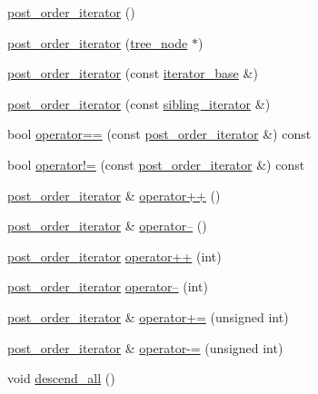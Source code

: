 \begin{CompactItemize}
\item 
\hyperlink{classtree_1_1post__order__iterator_f6d2a1ff77da1ca318447faef819fb22}{post\_\-order\_\-iterator} ()
\item 
\hyperlink{classtree_1_1post__order__iterator_add3e555f6a69c1799cb5b9b12e3ef48}{post\_\-order\_\-iterator} (\hyperlink{classtree__node__}{tree\_\-node} $\ast$)
\item 
\hyperlink{classtree_1_1post__order__iterator_bbe898c229fab7e833da744a76aca5ab}{post\_\-order\_\-iterator} (const \hyperlink{classtree_1_1iterator__base}{iterator\_\-base} \&)
\item 
\hyperlink{classtree_1_1post__order__iterator_d1bba922181132f5c41a6ebd5230abe9}{post\_\-order\_\-iterator} (const \hyperlink{classtree_1_1sibling__iterator}{sibling\_\-iterator} \&)
\item 
bool \hyperlink{classtree_1_1post__order__iterator_b1303f191d6bc8a62e5f03fa53466ec4}{operator==} (const \hyperlink{classtree_1_1post__order__iterator}{post\_\-order\_\-iterator} \&) const 
\item 
bool \hyperlink{classtree_1_1post__order__iterator_59f0d0d145f27ed094a69214e1831102}{operator!=} (const \hyperlink{classtree_1_1post__order__iterator}{post\_\-order\_\-iterator} \&) const 
\item 
\hyperlink{classtree_1_1post__order__iterator}{post\_\-order\_\-iterator} \& \hyperlink{classtree_1_1post__order__iterator_baba42c4ecb0a0bb8b21b0c28dfa3009}{operator++} ()
\item 
\hyperlink{classtree_1_1post__order__iterator}{post\_\-order\_\-iterator} \& \hyperlink{classtree_1_1post__order__iterator_f70bbd10b24ca0cf1c674e4ef40899db}{operator--} ()
\item 
\hyperlink{classtree_1_1post__order__iterator}{post\_\-order\_\-iterator} \hyperlink{classtree_1_1post__order__iterator_7041325e846017886e7c43d9c1c2cddb}{operator++} (int)
\item 
\hyperlink{classtree_1_1post__order__iterator}{post\_\-order\_\-iterator} \hyperlink{classtree_1_1post__order__iterator_f2c0df6c235853aa2191d02a557a1fea}{operator--} (int)
\item 
\hyperlink{classtree_1_1post__order__iterator}{post\_\-order\_\-iterator} \& \hyperlink{classtree_1_1post__order__iterator_0b6c2246f41b0a2ff8e4c9d9efcee879}{operator+=} (unsigned int)
\item 
\hyperlink{classtree_1_1post__order__iterator}{post\_\-order\_\-iterator} \& \hyperlink{classtree_1_1post__order__iterator_93b7ddae75f30985a0d81f38bcbaa306}{operator-=} (unsigned int)
\item 
void \hyperlink{classtree_1_1post__order__iterator_ca4676b4986854521cfa2c7d84f62204}{descend\_\-all} ()
\end{CompactItemize}
